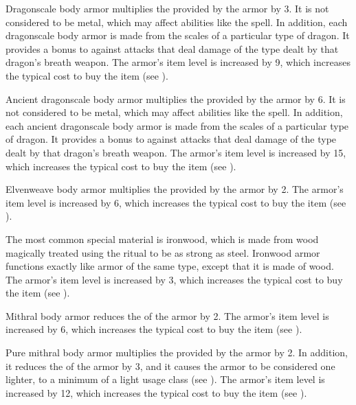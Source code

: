          Dragonscale body armor multiplies the  provided by the armor by 3.
        It is not considered to be metal, which may affect abilities like the  spell.
        In addition, each dragonscale body armor is made from the scales of a particular type of dragon.
        It provides a  bonus to  against attacks that deal damage of the type dealt by that dragon's breath weapon.
        The armor's item level is increased by 9, which increases the typical cost to buy the item (see ).

         Ancient dragonscale body armor multiplies the  provided by the armor by 6.
        It is not considered to be metal, which may affect abilities like the  spell.
        In addition, each ancient dragonscale body armor is made from the scales of a particular type of dragon.
        It provides a  bonus to  against attacks that deal damage of the type dealt by that dragon's breath weapon.
        The armor's item level is increased by 15, which increases the typical cost to buy the item (see ).

         Elvenweave body armor multiplies the  provided by the armor by 2.
        The armor's item level is increased by 6, which increases the typical cost to buy the item (see ).

         The most common special material is ironwood, which is made from wood magically treated using the  ritual to be as strong as steel. Ironwood armor functions exactly like armor of the same type, except that it is made of wood.
        The armor's item level is increased by 3, which increases the typical cost to buy the item (see ).

         Mithral body armor reduces the  of the armor by 2.
        The armor's item level is increased by 6, which increases the typical cost to buy the item (see ).

         Pure mithral body armor multiplies the  provided by the armor by 2.
        In addition, it reduces the  of the armor by 3, and it causes the armor to be considered one  lighter, to a minimum of a light usage class (see ).
        The armor's item level is increased by 12, which increases the typical cost to buy the item (see ).

